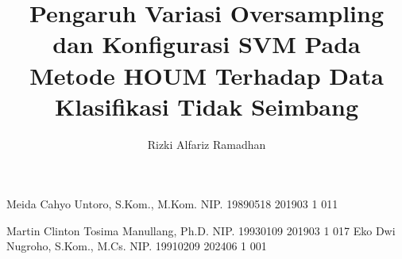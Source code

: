 \documentclass[article]{report} %
\begin{document}
    
    \title{Pengaruh Variasi Oversampling dan Konfigurasi SVM Pada Metode HOUM Terhadap Data Klasifikasi Tidak Seimbang}
    
	\author{Rizki Alfariz Ramadhan}		%
	
	\dosbingA%
		{Meida Cahyo Untoro, S.Kom., M.Kom.}%
		{NIP. 19890518 201903 1 011}	%
		
	\pengujiA%
		{Martin Clinton Tosima Manullang, Ph.D.}%
		{NIP. 19930109 201903 1 017}	%
	\pengujiB%
		{Eko Dwi Nugroho, S.Kom., M.Cs.}%
		{NIP. 19910209 202406 1 001}	%

	\sloppy %
    \setcounter{page}{1} %
\end{document}
